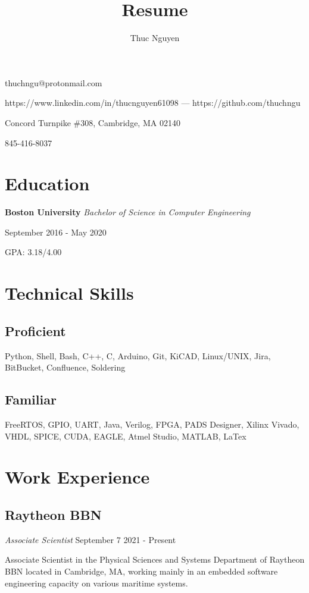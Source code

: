 \documentclass{article}
\makeatletter
\renewcommand{\maketitle}
{\begin{center}
{\huge\bfseries\theauthor}
\vspace{.5em}

thuchngu@protonmail.com

https://www.linkedin.com/in/thucnguyen61098 --- https://github.com/thuchngu

\end{center}}
\makeatother
\begin{document}
\title{Resume}
\author{Thuc Nguyen}
\maketitle
\vspace{-.5em}
{ Concord Turnpike \#308, Cambridge, MA 02140

845-416-8037

}
\vspace{-1.5em}
\section{Education}
\textbf{Boston University}  \textit{Bachelor of Science in Computer Engineering}

September 2016 - May 2020

GPA: 3.18/4.00

\vspace{-.75em}
\section{Technical Skills}
\subsection{Proficient}
Python, Shell, Bash, C++, C, Arduino, Git, KiCAD, Linux/UNIX, Jira, BitBucket, Confluence, Soldering
\vspace{-.75em}
\subsection{Familiar}
FreeRTOS, GPIO, UART, Java, Verilog, FPGA, PADS Designer, Xilinx Vivado, VHDL, SPICE, CUDA, EAGLE, Atmel Studio, MATLAB, LaTex

\vspace{-.75em}
\section{Work Experience}
\subsection{Raytheon BBN} \textit{Associate Scientist}
  September 7 2021 - Present

Associate Scientist in the Physical Sciences and Systems Department of Raytheon BBN located in Cambridge, MA, working mainly in an embedded software engineering capacity on various maritime systems.
\vspace{-.75em}
\end{document}
